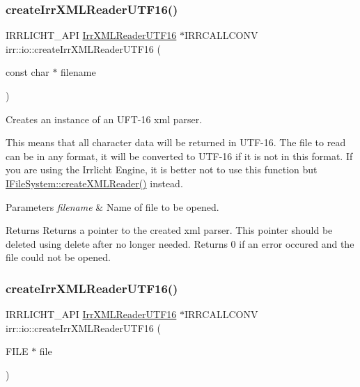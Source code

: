 \subsubsection{\texorpdfstring{create\+Irr\+X\+M\+L\+Reader\+U\+T\+F16()}{createIrrXMLReaderUTF16()}\hspace{0.1cm}{\footnotesize\ttfamily [1/3]}}
{\footnotesize\ttfamily I\+R\+R\+L\+I\+C\+H\+T\+\_\+\+A\+PI \hyperlink{namespaceirr_1_1io_a76b498bd6edceb2e2ef91d75585e6bfd}{Irr\+X\+M\+L\+Reader\+U\+T\+F16} $\ast$I\+R\+R\+C\+A\+L\+L\+C\+O\+NV irr\+::io\+::create\+Irr\+X\+M\+L\+Reader\+U\+T\+F16 (\begin{DoxyParamCaption}\item[{const char $\ast$}]{filename }\end{DoxyParamCaption})}



Creates an instance of an U\+F\+T-\/16 xml parser. 

This means that all character data will be returned in U\+T\+F-\/16. The file to read can be in any format, it will be converted to U\+T\+F-\/16 if it is not in this format. If you are using the Irrlicht Engine, it is better not to use this function but \hyperlink{classirr_1_1io_1_1IFileSystem_a167c9fa159d16ee5c56c074636b0865e}{I\+File\+System\+::create\+X\+M\+L\+Reader()} instead. 
\begin{DoxyParams}{Parameters}
{\em filename} & Name of file to be opened. \\
\hline
\end{DoxyParams}
\begin{DoxyReturn}{Returns}
Returns a pointer to the created xml parser. This pointer should be deleted using \textquotesingle{}delete\textquotesingle{} after no longer needed. Returns 0 if an error occured and the file could not be opened. 
\end{DoxyReturn}
\mbox{\label{namespaceirr_1_1io_a12b07ff1ad1f30166bc5d6ddf1c9ee4e}} 
\subsubsection{\texorpdfstring{create\+Irr\+X\+M\+L\+Reader\+U\+T\+F16()}{createIrrXMLReaderUTF16()}\hspace{0.1cm}{\footnotesize\ttfamily [2/3]}}
{\footnotesize\ttfamily I\+R\+R\+L\+I\+C\+H\+T\+\_\+\+A\+PI \hyperlink{namespaceirr_1_1io_a76b498bd6edceb2e2ef91d75585e6bfd}{Irr\+X\+M\+L\+Reader\+U\+T\+F16} $\ast$I\+R\+R\+C\+A\+L\+L\+C\+O\+NV irr\+::io\+::create\+Irr\+X\+M\+L\+Reader\+U\+T\+F16 (\begin{DoxyParamCaption}\item[{F\+I\+LE $\ast$}]{file }\end{DoxyParamCaption})}



